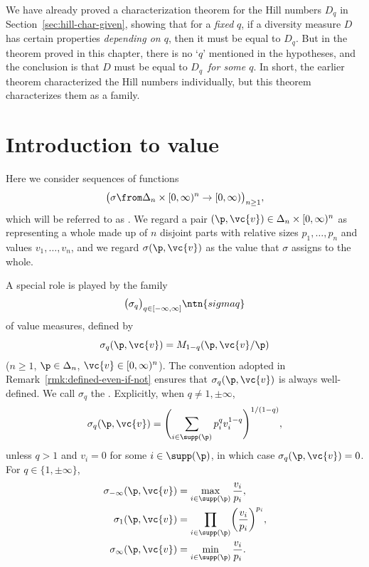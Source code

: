 We have already proved a characterization theorem for the Hill%
%  
% 
numbers $D_q$ in Section~\ref{sec:hill-char-given}, showing that for a
\emph{fixed} $q$, if a diversity measure $D$ has certain properties
\emph{depending on $q$}, then it must be equal to $D_q$.  But in the
theorem proved in this chapter, there is no `$q$' mentioned in the
hypotheses, and the conclusion is that $D$ must be equal to $D_q$
\emph{\,for some $q$}.  In short, the earlier theorem characterized
the Hill numbers individually, but this theorem characterizes them as a
family.


\section{Introduction to value}


Here we consider sequences of functions
\[
\bigl( 
\sigma \from \Delta_n \times [0, \infty)^n \to [0, \infty) 
\bigr)_{n \geq 1},
\]
which will be referred to as .  We regard a pair $(\p, \vc{v}) \in \Delta_n \times [0,
\infty)^n$ as representing a whole made up of $n$ disjoint parts with
relative sizes $p_1, \ldots, p_n$ and values $v_1, \ldots, v_n$, and we
regard $\sigma(\p, \vc{v})$ as the value that $\sigma$ assigns to the
whole.

A special role is played by the family 
\[
\bigl( \sigma_q \bigr)_{q \in [-\infty, \infty]}
\ntn{sigmaq}
\]
of value measures, defined by
\[
\sigma_q(\p, \vc{v}) = M_{1 - q} (\p, \vc{v}/\p)
\]
($n \geq 1$, $\p \in \Delta_n$, $\vc{v} \in [0, \infty)^n$).  The
convention adopted in Remark~\ref{rmk:defined-even-if-not} ensures that
$\sigma_q(\p, \vc{v})$ is always well-defined.
We call $\sigma_q$ the .  Explicitly, when $q \neq 1, \pm \infty$,
\[
\sigma_q(\p, \vc{v})
=
\Biggl( 
\sum_{i \in \supp(\p)} p_i^q v_i^{1 - q} 
\Biggr)^{1/(1 - q)},
\]
unless $q > 1$ and $v_i = 0$ for some $i \in \supp(\p)$, in which case
$\sigma_q(\p, \vc{v}) = 0$.  For $q \in \{1, \pm\infty\}$, 
% 
\begin{align*}
\sigma_{-\infty}(\p, \vc{v})    &
=
\max_{i \in \supp(\p)} \frac{v_i}{p_i}, \\
\sigma_1(\p, \vc{v})    &
=
\prod_{i \in \supp(\p)} \biggl( \frac{v_i}{p_i} \biggr)^{p_i},    \\
\sigma_{\infty}(\p, \vc{v})     &
=
\min_{i \in \supp(\p)} \frac{v_i}{p_i}.
\end{align*}
% 

